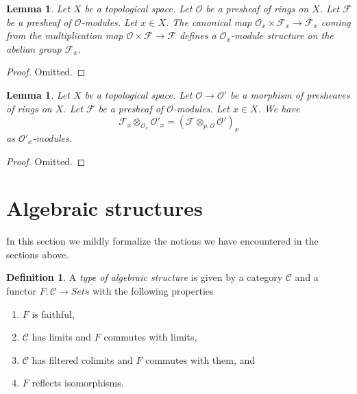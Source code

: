 \documentclass{stacks-project}
\theoremstyle{plain}
\newtheorem{lemma}[subsection]{Lemma}
\theoremstyle{definition}
\newtheorem{definition}[subsection]{Definition}
\theoremstyle{remark}
\numberwithin{equation}{subsection}
\begin{document}
\begin{lemma}
\label{lemma-stalk-module}
Let $X$ be a topological space.
Let $\mathcal{O}$ be a presheaf of rings on $X$.
Let $\mathcal{F}$ be a presheaf of $\mathcal{O}$-modules.
Let $x \in X$.
The canonical map $\mathcal{O}_x \times \mathcal{F}_x
\to \mathcal{F}_x$ coming from the multiplication map
$\mathcal{O} \times \mathcal{F} \to \mathcal{F}$ defines
a $\mathcal{O}_x$-module structure on the abelian group
$\mathcal{F}_x$.
\end{lemma}

\begin{proof}
Omitted.
\end{proof}

\begin{lemma}
\label{lemma-stalk-tensor-presheaf-modules}
Let $X$ be a topological space.
Let $\mathcal{O} \to \mathcal{O}'$ be a morphism of
presheaves of rings on $X$.
Let $\mathcal{F}$ be a presheaf of $\mathcal{O}$-modules.
Let $x \in X$. We have
$$
\mathcal{F}_x \otimes_{\mathcal{O}_x} \mathcal{O}'_x
=
(\mathcal{F} \otimes_{p, \mathcal{O}} \mathcal{O}')_x
$$
as $\mathcal{O}'_x$-modules.
\end{lemma}

\begin{proof}
Omitted.
\end{proof}


\section{Algebraic structures}
\label{section-algebraic-structures}

\noindent
In this section we mildly formalize the notions we have
encountered in the sections above.

\begin{definition}
\label{definition-algebraic-structure}
A {\it type of algebraic structure} is given by a category $\mathcal{C}$
and a functor $F : \mathcal{C} \to \textit{Sets}$ with the
following properties
\begin{enumerate}
\item $F$ is faithful,
\item $\mathcal{C}$ has limits and $F$ commutes with limits,
\item $\mathcal{C}$ has filtered colimits and $F$ commutes with them, and
\item $F$ reflects isomorphisms.
\end{enumerate}
\end{definition}
\end{document}
